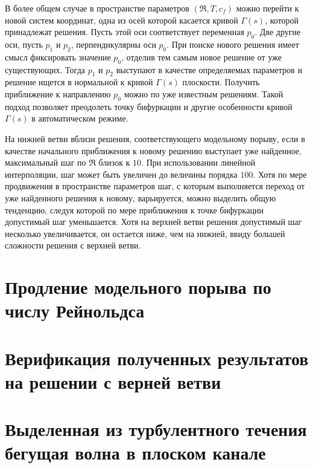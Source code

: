 В более общем случае в пространстве параметров $(\Re, T, c_f)$ можно перейти к новой систем координат, одна из осей которой касается кривой $\Gamma(s)$, которой принадлежат решения. Пусть этой оси соответствует переменная $p_0$. Две другие оси, пусть $p_1$ и $p_2$, перпендикулярны оси $p_0$. При поиске нового решения имеет смысл фиксировать значение $p_0$, отделив тем самым новое решение от уже существующих. Тогда $p_1$ и $p_2$ выступают в качестве определяемых параметров и решение ищется в нормальной к кривой $\Gamma(s)$ плоскости. Получить приближение к направлению $p_0$ можно по уже известным решениям. Такой подход позволяет преодолеть точку бифуркации и другие особенности кривой $\Gamma(s)$ в автоматическом режиме. 

На нижней ветви вблизи решения, соответствующего модельному порыву, если в качестве начального приближения к новому решению выступает уже найденное, максимальный шаг по $\Re$ близок к $10$. При использовании линейной интерполяции, шаг может быть увеличен до величины порядка $100$. Хотя по мере продвижения в пространстве параметров шаг, с которым выполняется переход от уже найденного решения к новому, варьируется, можно выделить общую тенденцию, следуя которой по мере приближения к точке бифуркации допустимый шаг уменьшается. Хотя на верхней ветви решения допустимый шаг несколько увеличивается, он остается ниже, чем на нижней, ввиду большей сложности решения с верхней ветви. 
 

\section{Продление модельного порыва по числу Рейнольдса}

\section{Верификация полученных результатов на решении с верней ветви}

\section{Выделенная из турбулентного течения бегущая волна в плоском канале}




